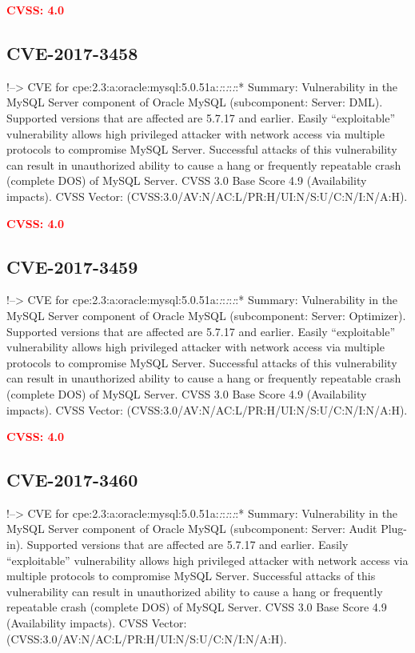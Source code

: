 \documentclass[a4paper, 12pt]{article}
\begin{document}
\textbf{\textcolor{red}{CVSS: 4.0}}

\hypertarget{cve-2017-3458}{%
\subsection{CVE-2017-3458}\label{cve-2017-3458}}

!--\textgreater{} CVE for
cpe:2.3:a:oracle:mysql:5.0.51a:\emph{:}:\emph{:}:\emph{:}:* Summary:
Vulnerability in the MySQL Server component of Oracle MySQL
(subcomponent: Server: DML). Supported versions that are affected are
5.7.17 and earlier. Easily ``exploitable'' vulnerability allows high
privileged attacker with network access via multiple protocols to
compromise MySQL Server. Successful attacks of this vulnerability can
result in unauthorized ability to cause a hang or frequently repeatable
crash (complete DOS) of MySQL Server. CVSS 3.0 Base Score 4.9
(Availability impacts). CVSS Vector:
(CVSS:3.0/AV:N/AC:L/PR:H/UI:N/S:U/C:N/I:N/A:H).

\textbf{\textcolor{red}{CVSS: 4.0}}

\hypertarget{cve-2017-3459}{%
\subsection{CVE-2017-3459}\label{cve-2017-3459}}

!--\textgreater{} CVE for
cpe:2.3:a:oracle:mysql:5.0.51a:\emph{:}:\emph{:}:\emph{:}:* Summary:
Vulnerability in the MySQL Server component of Oracle MySQL
(subcomponent: Server: Optimizer). Supported versions that are affected
are 5.7.17 and earlier. Easily ``exploitable'' vulnerability allows high
privileged attacker with network access via multiple protocols to
compromise MySQL Server. Successful attacks of this vulnerability can
result in unauthorized ability to cause a hang or frequently repeatable
crash (complete DOS) of MySQL Server. CVSS 3.0 Base Score 4.9
(Availability impacts). CVSS Vector:
(CVSS:3.0/AV:N/AC:L/PR:H/UI:N/S:U/C:N/I:N/A:H).

\textbf{\textcolor{red}{CVSS: 4.0}}

\hypertarget{cve-2017-3460}{%
\subsection{CVE-2017-3460}\label{cve-2017-3460}}

!--\textgreater{} CVE for
cpe:2.3:a:oracle:mysql:5.0.51a:\emph{:}:\emph{:}:\emph{:}:* Summary:
Vulnerability in the MySQL Server component of Oracle MySQL
(subcomponent: Server: Audit Plug-in). Supported versions that are
affected are 5.7.17 and earlier. Easily ``exploitable'' vulnerability
allows high privileged attacker with network access via multiple
protocols to compromise MySQL Server. Successful attacks of this
vulnerability can result in unauthorized ability to cause a hang or
frequently repeatable crash (complete DOS) of MySQL Server. CVSS 3.0
Base Score 4.9 (Availability impacts). CVSS Vector:
(CVSS:3.0/AV:N/AC:L/PR:H/UI:N/S:U/C:N/I:N/A:H).
\end{document}
